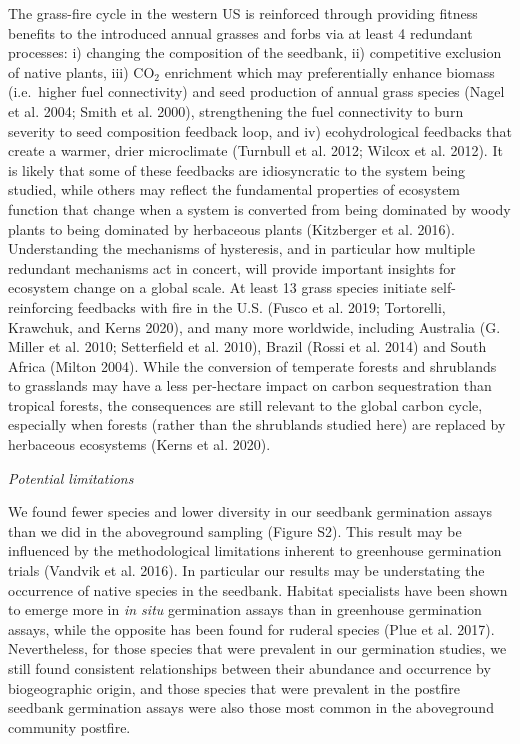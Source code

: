 \documentclass[
  12pt,
]{article}
\begin{document}
The grass-fire cycle in the western US is reinforced through providing
fitness benefits to the introduced annual grasses and forbs via at least
4 redundant processes: i) changing the composition of the seedbank, ii)
competitive exclusion of native plants, iii) CO\(_2\) enrichment which
may preferentially enhance biomass (i.e.~higher fuel connectivity) and
seed production of annual grass species (Nagel et al. 2004; Smith et al.
2000), strengthening the fuel connectivity to burn severity to seed
composition feedback loop, and iv) ecohydrological feedbacks that create
a warmer, drier microclimate (Turnbull et al. 2012; Wilcox et al. 2012).
It is likely that some of these feedbacks are idiosyncratic to the
system being studied, while others may reflect the fundamental
properties of ecosystem function that change when a system is converted
from being dominated by woody plants to being dominated by herbaceous
plants (Kitzberger et al. 2016). Understanding the mechanisms of
hysteresis, and in particular how multiple redundant mechanisms act in
concert, will provide important insights for ecosystem change on a
global scale. At least 13 grass species initiate self-reinforcing
feedbacks with fire in the U.S. (Fusco et al. 2019; Tortorelli,
Krawchuk, and Kerns 2020), and many more worldwide, including Australia
(G. Miller et al. 2010; Setterfield et al. 2010), Brazil (Rossi et al.
2014) and South Africa (Milton 2004). While the conversion of temperate
forests and shrublands to grasslands may have a less per-hectare impact
on carbon sequestration than tropical forests, the consequences are
still relevant to the global carbon cycle, especially when forests
(rather than the shrublands studied here) are replaced by herbaceous
ecosystems (Kerns et al. 2020).

\emph{Potential limitations}

We found fewer species and lower diversity in our seedbank germination
assays than we did in the aboveground sampling (Figure S2). This result
may be influenced by the methodological limitations inherent to
greenhouse germination trials (Vandvik et al. 2016). In particular our
results may be understating the occurrence of native species in the
seedbank. Habitat specialists have been shown to emerge more in \emph{in
situ} germination assays than in greenhouse germination assays, while
the opposite has been found for ruderal species (Plue et al. 2017).
Nevertheless, for those species that were prevalent in our germination
studies, we still found consistent relationships between their abundance
and occurrence by biogeographic origin, and those species that were
prevalent in the postfire seedbank germination assays were also those
most common in the aboveground community postfire.
\end{document}
